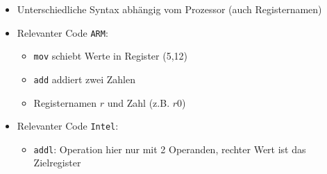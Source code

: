\begin{itemize}
\begin{itemize}
                    \begin{itemize}
                        \item Unterschiedliche Syntax abhängig vom Prozessor (auch Registernamen)
                        \item Relevanter Code \texttt{ARM}:
                            \begin{itemize}
                                \item \texttt{mov} schiebt Werte in Register (5,12)
                                \item \texttt{add} addiert zwei Zahlen
                                \item Registernamen $r$ und Zahl (z.B. $r0$)
                            \end{itemize}

                        \item Relevanter Code \texttt{Intel}:
                            \begin{itemize}
                                \item \texttt{addl}: Operation hier nur mit 2 Operanden, rechter Wert ist das Zielregister
                            \end{itemize}
                    \end{itemize}
            \end{itemize}


\end{itemize}

